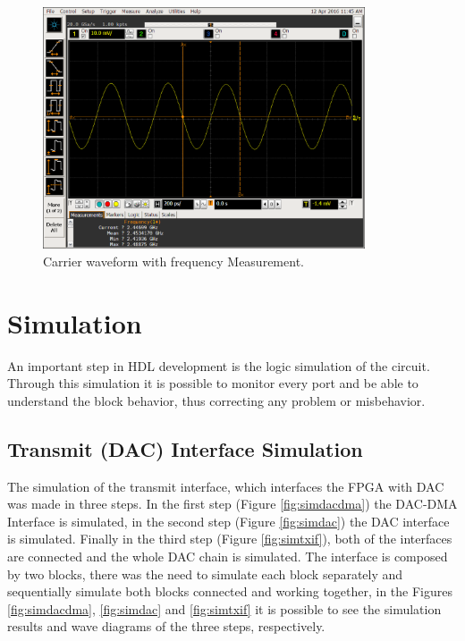 \begin{figure}[htbp]
    \centering
    \includegraphics[width=0.85\textwidth,
    trim={{.17\textwidth} 0 {.02\textwidth} {.24\textwidth}},
    clip]{./figures/oscill_freq}
    \caption{ Carrier waveform with frequency Measurement.
    \label{fig:oscillfreq}}
\end{figure}



\section{Simulation}

An important step in HDL development is the logic simulation of the circuit.
Through this simulation it is possible to monitor every port and be able to
understand the block behavior, thus correcting any problem or misbehavior.

\subsection{Transmit (DAC) Interface Simulation}

The simulation of the transmit interface, which interfaces the FPGA with DAC was
made in three steps. In the first step (Figure \ref{fig:simdacdma}) the DAC-DMA
Interface is simulated, in the second step (Figure \ref{fig:simdac}) the DAC
interface is simulated. Finally in the third step (Figure \ref{fig:simtxif}),
both of the interfaces are connected and the whole DAC chain is simulated. The
interface is composed by two blocks, there was the need to simulate each block
separately and sequentially simulate both blocks connected and working together,
in the Figures \ref{fig:simdacdma}, \ref{fig:simdac} and \ref{fig:simtxif} it is
possible to see the simulation results and wave diagrams of the three steps,
respectively.

